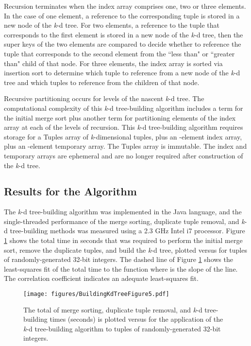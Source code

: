 \documentclass{sig-alternate}
\begin{document}
Recursion terminates when the index array comprises one, two or three elements.  In the case of one element, a reference to the corresponding tuple is stored in a new node of the \emph{k}-d tree.  For two elements, a reference to the tuple that corresponds to the first element is stored in a new node of the \emph{k}-d tree, then the super keys of the two elements are compared to decide whether to reference the tuple that corresponds to the second element from the ``less than" or ``greater than" child of that node.  For three elements, the index array is sorted via insertion sort \cite{Bentley2} to determine which tuple to reference from a new node of the \emph{k}-d tree and which tuples to reference from the children of that node.

Recursive partitioning occurs for  levels of the nascent \emph{k}-d tree.  The computational complexity of this \emph{k}-d tree-building algorithm includes a  term for the initial merge sort plus another  term for partitioning  elements of the index array at each of the  levels of recursion.  This  \emph{k}-d tree-building algorithm requires storage for a Tuples array of  \emph{k}-dimensional tuples, plus an -element index array, plus an -element temporary array.  The Tuples array is immutable.  The index and temporary arrays are ephemeral and are no longer required after construction of the \emph{k}-d tree.

\subsection{Results for the  Algorithm}
\label{sec:nlogn_results}

The  \emph{k}-d tree-building algorithm was implemented in the Java language, and the single-threaded performance of the merge sorting, duplicate tuple removal, and \emph{k}-d tree-building methods was measured using a 2.3 GHz Intel i7 processor.  Figure \ref{fig:ComparativeTime} shows the total time in seconds that was required to perform the initial merge sort, remove the duplicate tuples, and build the \emph{k}-d tree, plotted versus  for   tuples of randomly-generated 32-bit integers.  The dashed line of Figure \ref{fig:ComparativeTime} shows the least-squares fit of the total time  to the function  where  is the slope of the line.  The correlation coefficient  indicates an adequate least-squares fit.

\begin{figure}[h!]
\centering
\centerline{\texttt{[image: figures/BuildingKdTreeFigure5.pdf]}}
\caption{The total of merge sorting, duplicate tuple removal, and \emph{k}-d tree-building times (seconds) is plotted versus  for the application of the  \emph{k}-d tree-building algorithm to   tuples of randomly-generated 32-bit integers.}
\label{fig:ComparativeTime}
\end{figure}
\end{document}
